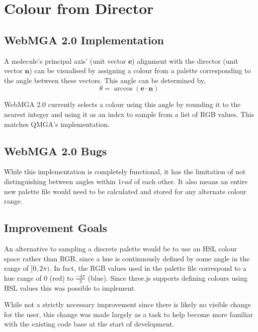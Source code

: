 \section{Colour from Director}
\label{colour_director}
\subsection{WebMGA 2.0 Implementation}
A molecule's principal axis' (unit vector $\mathbf{e}$) alignment with the director (unit vector $\mathbf{n}$) can be visualised by assigning a colour from a palette corresponding to the angle between these vectors. This angle can be determined by,
\begin{equation}
\theta=\arccos( \mathbf{e}\cdot \mathbf{n})
\label{theta_gen}
\end{equation}

WebMGA 2.0 currently selects a colour using this angle by rounding it to the nearest integer and using it as an index to sample from a list of RGB values. This matches QMGA's implementation.

\subsection{WebMGA 2.0 Bugs}
While this implementation is completely functional, it has the limitation of not distinguishing between angles within $1 rad$ of each other. It also means an entire new palette file would need to be calculated and stored for any alternate colour range.

\subsection{Improvement Goals}
An alternative to sampling a discrete palette would be to use an HSL colour space rather than RGB, since a hue is continuously defined by some angle in the range of $[0, 2\pi)$. In fact, the RGB values used in the palette file correspond to a hue range of $0$ (red) to $\frac{-4\pi}{3}$ (blue). Since three.js supports defining colours using HSL values\cite{three_colour} this was possible to implement.

While not a strictly necessary improvement since there is likely no visible change for the user, this change was made largely as a task to help become more familiar with the existing code base at the start of development.


